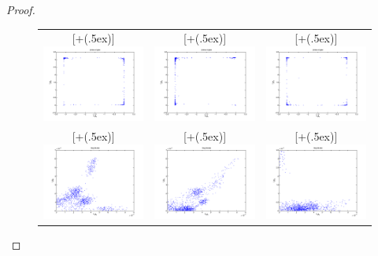 \documentclass{article} %
\newcommand*{\addheight}[2][.5ex]{%
  \raisebox{0pt}[\dimexpr\height+(#1)\relax]{#2}%
}
\theoremstyle{plain}
\numberwithin{equation}{section} %
\numberwithin{figure}{section} %
\numberwithin{table}{section} %
\begin{document}
\begin{proof}
\begin{figure}[ht!]
        \label{fig:3}
    \end{figure}
    \begin{figure}
        \centering
        \begin{tabular}[ht!]{ccc}
            \addheight{\includegraphics[width=50mm]{12a.png}} & \addheight{\includegraphics[width=50mm]{13a.png}} & \addheight{\includegraphics[width=50mm]{14a.png}} \\
            \addheight{\includegraphics[width=50mm]{12m.png}} & \addheight{\includegraphics[width=50mm]{13m.png}} & \addheight{\includegraphics[width=50mm]{14m.png}} \\

\end{tabular}
\end{figure}
\end{proof}
\end{document}
